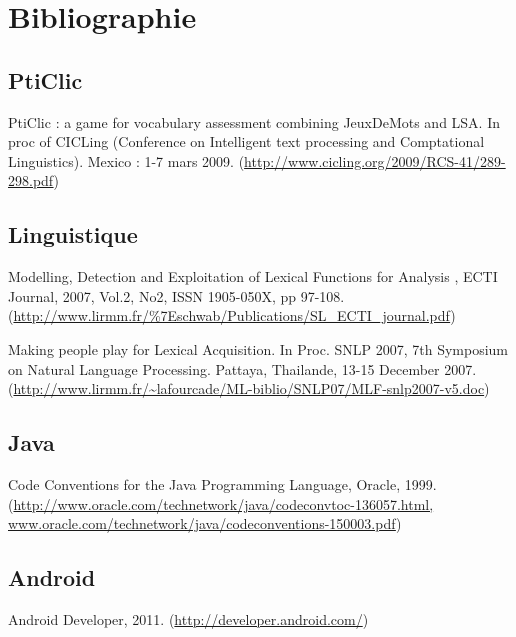 \documentclass[a4paper,11pt,french]{article}
\def\android{Android\texttrademark{}}
\begin{document}
{\newpage


\section{Bibliographie}
\subsection{PtiClic}

PtiClic : a game for vocabulary assessment combining JeuxDeMots and LSA. In proc of CICLing (Conference on Intelligent text processing and Comptational Linguistics). Mexico : 1-7 mars 2009. (\url{http://www.cicling.org/2009/RCS-41/289-298.pdf})


\subsection{Linguistique}

Modelling, Detection and Exploitation of Lexical Functions for Analysis , ECTI Journal, 2007, Vol.2, No2, ISSN 1905-050X, pp 97-108. (\url{http://www.lirmm.fr/\%7Eschwab/Publications/SL_ECTI_journal.pdf})

Making people play for Lexical Acquisition. In Proc. SNLP 2007, 7th Symposium on Natural Language Processing. Pattaya, Thailande, 13-15 December 2007. (\url{http://www.lirmm.fr/~lafourcade/ML-biblio/SNLP07/MLF-snlp2007-v5.doc})


\subsection{Java}

Code Conventions for the Java Programming Language, Oracle, 1999. (\url{http://www.oracle.com/technetwork/java/codeconvtoc-136057.html, www.oracle.com/technetwork/java/codeconventions-150003.pdf})

\subsection{\android{}}

Android Developer, 2011. (\url{http://developer.android.com/})





}
\end{document}
